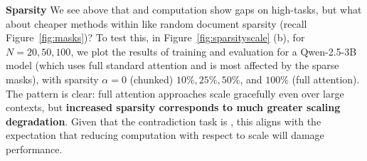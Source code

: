 \textbf{Sparsity} We see above that  and  computation show gaps on high-\cname tasks, but what about cheaper methods within  like random document sparsity (recall Figure~\ref{fig:masks})? To test this, in Figure~\ref{fig:sparsityscale} (b), for $N=20, 50, 100$, we plot the results of training and evaluation for a Qwen-2.5-3B model (which uses full standard attention and is most affected by the sparse masks), with sparsity $\alpha = 0$ (chunked) $10\%, 25\%, 50\%$, and $100\%$ (full attention).  The pattern is clear: full attention approaches scale gracefully even over large contexts, but \textbf{increased sparsity corresponds to much greater scaling degradation}. Given that the contradiction task is  \cname, this aligns with the expectation that reducing computation with respect to scale will damage performance. 





